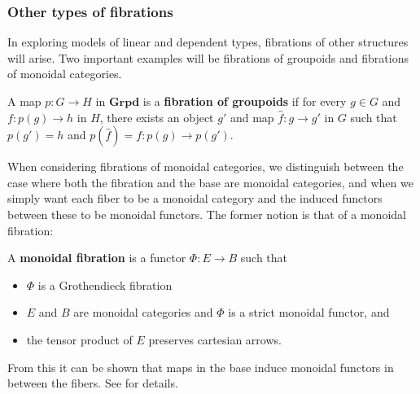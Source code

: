 \subsubsection{Other types of fibrations}
In exploring models of linear and dependent types, fibrations of other structures will arise. Two important examples will be fibrations of groupoids and fibrations of monoidal categories.
\begin{defn}
A map $p : G \to H$ in $\textbf{Grpd}$ is a \textbf{fibration of groupoids} if for every $g \in G$
and $f : p(g) \to h$ in $H$, there exists an object $g'$ and map $\hat f : g \to g'$ in $G$ such that $p(g') = h$ and $p(\hat f) = f : p(g) \to p(g')$.
\end{defn}
When considering fibrations of monoidal categories, we distinguish between the case where both the fibration and the base are monoidal categories, and when we simply want each fiber to be a monoidal category and the induced functors between these to be monoidal functors. The former notion is that of a monoidal fibration:
\begin{defn}
A \textbf{monoidal fibration} is a functor $\Phi\colon E\to B$ such that
\begin{itemize}
\item $\Phi$ is a Grothendieck fibration
\item $E$ and $B$ are monoidal categories and $\Phi$ is a strict monoidal functor, and
\item the tensor product of $E$ preserves cartesian arrows.
\end{itemize}
\end{defn}
From this it can be shown that maps in the base induce monoidal functors in between the fibers. See \cite{shulmanmonoidal} for details.


